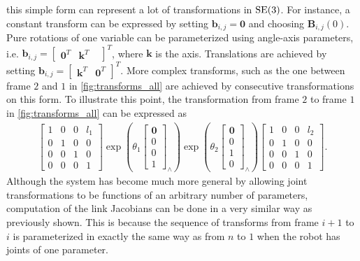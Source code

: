 this simple form can represent a lot of transformations in $\operatorname{SE}(3)$. For instance,
a constant transform can be expressed by setting $\bm{b}_{i,j} = \bm{0}$ and choosing $\bm{B}_{i,j}(0)$.
Pure rotations of one variable can be parameterized using angle-axis parameters, i.e. $\bm{b}_{i,j} =
\begin{bmatrix}\bm{0}^T & \bm{k}^T &\end{bmatrix}^T$, where $\bm{k}$ is the axis. Translations
are achieved by setting $\bm{b}_{i,j} = \begin{bmatrix} \bm{k}^T & \bm{0}^T \end{bmatrix}^T$.
More complex transforms, such as the one between frame $2$ and $1$ in \autoref{fig:transforms_all}
are achieved by consecutive transformations on this form. To illustrate this point, the transformation
from frame $2$ to frame $1$ in \autoref{fig:transforms_all} can be expressed as
\begin{align}
    \begin{bmatrix}1 & 0 & 0 & l_1 \\ 0 & 1 & 0 & 0 \\ 0 & 0 & 1 & 0 \\ 0 & 0 & 0 & 1\end{bmatrix}
    \exp\left(\theta_1\begin{bmatrix}\bm{0} \\ 0 \\ 0 \\ 1\end{bmatrix}_{\wedge}\right)
    \exp\left(\theta_2\begin{bmatrix}\bm{0} \\ 0 \\ 1 \\ 0\end{bmatrix}_{\wedge}\right)
    \begin{bmatrix}1 & 0 & 0 & l_2 \\ 0 & 1 & 0 & 0 \\ 0 & 0 & 1 & 0 \\ 0 & 0 & 0 & 1\end{bmatrix}.
\end{align}
Although the system has become much more general by allowing joint transformations to
be functions of an arbitrary number of parameters, computation of the link Jacobians can
be done in a very similar way as previously shown. This is because the sequence of
transforms from frame $i+1$ to $i$ is parameterized in exactly the same way as
from $n$ to $1$ when the robot has joints of one parameter.

